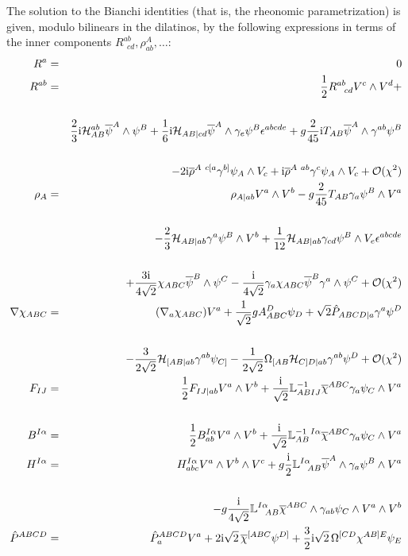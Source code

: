 \documentclass[a4paper,12pt]{article}
\def\bar{\overline}\end {picture}}
\begin{document}
The solution to the Bianchi identities
(that is, the rheonomic parametrization) is given,
modulo bilinears in the dilatinos, by  the following expressions in terms
of the inner components $R^{ab}_{~~cd}, \rho^A_{ab}, \dots$:
\begin{eqnarray}
R^a &=& 0 \\
R^{ab} &=& {1\over 2}
     R^{ab}_{~~cd} V^c\wedge V^d + \nonumber\\\nonumber\\
&& {2\over 3}{\rm i} \mathcal{H}_{AB}^{ab}\bar{\psi}^A\wedge\psi^B
   + {1\over 6}{\rm i} \mathcal{H}_{AB|cd}\bar{\psi}^A\wedge\gamma_e\psi^B\epsilon^{abcde} +
     g {2\over 45}{\rm i}T_{AB}\bar{\psi}^A\wedge\gamma^{ab}\psi^B  \nonumber\\\nonumber\\
&& - 2{\rm i} \bar{\rho}^{A~c[a}\gamma^{b]}\psi_A\wedge V_c +
     {\rm i} \bar{\rho}^{A~ab}\gamma^c\psi_A \wedge V_c + \mathcal{O} (\chi^2)\\
\rho _A  &=&
      \rho _{A|ab} V^a\wedge V^b - g {2\over 45}T_{AB}\gamma_a\psi^B\wedge V^a  \nonumber\\\nonumber\\
&& - {2\over 3} \mathcal{H}_{AB|ab}\gamma^a\psi^B\wedge V^b +
     {1\over 12} \mathcal{H}_{AB|ab}\gamma_{cd}\psi^B\wedge V_e \epsilon^{abcde}  \nonumber\\\nonumber\\
&& + {3{\rm i}\over 4\sqrt{2}} \chi_{ABC}\bar{\psi}^B\wedge \psi^C -
{{\rm i}\over 4\sqrt{2}} \gamma_a\chi_{ABC} \bar{\psi}^B\gamma^a\wedge\psi^C + \mathcal{O} (\chi^2) \\
\nabla\chi_{ABC} &=&
      (\nabla_a\chi_{ABC})V^a + {1\over\sqrt{2}} gA^D_{ABC}\psi_D +
\sqrt{2} \hat{P}_{ABCD|a}\gamma^a\psi^D \nonumber\\\nonumber\\
&& - {3\over 2\sqrt{2}}\mathcal{H}_{[AB|ab}\gamma^{ab}\psi_{C]}
-{1\over 2\sqrt{2}} \Omega_{[AB}\mathcal{H}_{C]D|ab}\gamma^{ab}\psi^D +
\mathcal{O} (\chi^2) \\
F_{IJ} &=& {1\over 2}F_{IJ|ab}V^a\wedge V^b + {{\rm i}\over\sqrt{2}}
\mathbb{L}^{-1}_{ABIJ}\bar{\chi}^{ABC}\gamma_a\psi_C\wedge V^a \\\nonumber\\
B^{I\alpha} &=& {1\over 2}B^{I\alpha}_{ab}V^a\wedge V^b +
{{\rm  i}\over\sqrt{2}}\mathbb{L}^{-1~I\alpha}_{AB}\bar{\chi}^{ABC}\gamma_a\psi_C\wedge V^a
\label{rheoB}\\
H^{I\alpha} &=& H^{I\alpha}_{abc}V^a\wedge V^b\wedge V^c +
g {{\rm i}\over 2}\mathbb{L}^{I\alpha}_{~~AB}\bar{\psi}^A\wedge\gamma_a\psi^B\wedge V^a
\nonumber\\\nonumber\\
&&-g {{\rm i}\over 4\sqrt{2}}
\mathbb{L}^{I\alpha}_{~~AB}\bar{\chi}^{ABC}\wedge\gamma_{ab}\psi_C\wedge V^a\wedge V^b
\label{rheoH}\\
\hat{P}^{ABCD} &=& \hat{P}^{ABCD}_a V^a + 2{\rm i}\sqrt{2}\,
\bar{\chi}^{[ABC}\psi^{D]}+\frac{3}{2}{\rm
i}\sqrt{2}\,\Omega^{[CD}\chi^{AB]E}\psi_E
\end{eqnarray}
\end{document}
